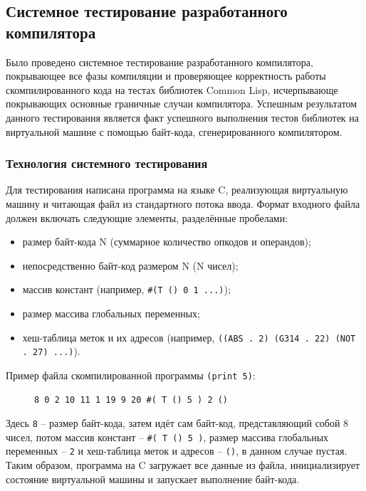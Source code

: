\subsection{Системное тестирование разработанного компилятора}

Было проведено системное тестирование разработанного компилятора, покрывающее все фазы компиляции и проверяющее корректность работы скомпилированного кода на тестах библиотек Common Lisp, исчерпывающе покрывающих основные граничные случаи компилятора. Успешным результатом данного тестирования является факт успешного выполнения тестов библиотек на виртуальной машине с помощью байт-кода, сгенерированного компилятором.


\subsubsection{Технология системного тестирования}

Для тестирования написана программа на языке C, реализующая виртуальную машину и читающая файл из стандартного потока ввода. Формат входного файла должен включать следующие элементы, разделённые пробелами:

\begin{itemize}
\item размер байт-кода N (суммарное количество опкодов и операндов);
\item непосредственно байт-код размером N (N чисел);
\item массив констант (например, \texttt{\#(T () 0 1 ...)});
\item размер массива глобальных переменных;
\item хеш-таблица меток и их адресов (например, \texttt{((ABS . 2) (G314 . 22) (NOT . 27) ...)}).
\end{itemize}

Пример файла скомпилированной программы \texttt{(print 5)}:

\begin{figure}[H]
\begin{lstlisting}[language={}]
8 0 2 10 11 1 19 9 20 #( T () 5 ) 2 ()
\end{lstlisting}
\end{figure}

Здесь \texttt{8} -- размер байт-кода, затем идёт сам байт-код, представляющий собой 8 чисел, потом массив констант -- \texttt{\#( T () 5 )}, размер массива глобальных переменных -- \texttt{2} и хеш-таблица меток и адресов -- \texttt{()}, в данном случае пустая. Таким образом, программа на C загружает все данные из файла, инициализирует состояние виртуальной машины и запускает выполнение байт-кода.

